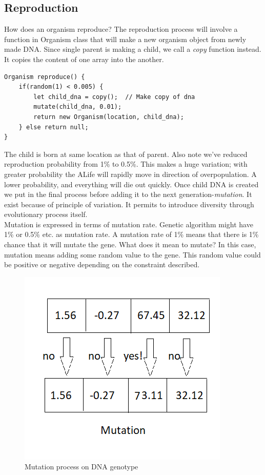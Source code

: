\documentclass[conference]{IEEEtran}
\begin{document}
\subsection{Reproduction}
How does an organism reproduce? The reproduction process will involve a function in Organism class that will make a new organism object from newly made DNA. Since single parent is making a child, we call a \textit{copy} function instead. It copies the content of one array into the another.
\begin{lstlisting}[caption=Function returning new organism: the child]
Organism reproduce() {
	if(random(1) < 0.005) {
		let child_dna = copy();  // Make copy of dna	
		mutate(child_dna, 0.01);
		return new Organism(location, child_dna);
	} else return null;
}
\end{lstlisting}
The child is born at same location as that of parent. Also note we've reduced reproduction probability from 1\% to 0.5\%. This makes a huge variation; with greater probability the ALife will rapidly move in direction of overpopulation. A lower probability, and everything will die out quickly. Once child DNA is created we put in the final process before adding it to the next generation-\textit{mutation}. It exist because of principle of variation. It permits to introduce diversity through evolutionary process itself.\\
Mutation is expressed in terms of mutation rate. Genetic algorithm might have 1\% or 0.5\% etc. as mutation rate. A mutation rate of 1\% means that there is 1\% chance that it will mutate the gene. What does it mean to mutate? In this case, mutation means adding some random value to the gene. This random value could be positive or negative depending on the constraint described.\\
\begin{figure}
	\includegraphics[scale=1]{mutation.png}
	\caption{Mutation process on DNA genotype}
	\label{fig:mutation}
\end{figure}
\end{document}
